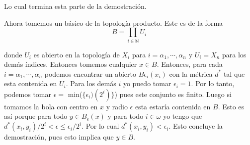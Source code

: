 \documentclass[letter,twoside,12pt]{article}
\begin{document}
\begin{enumerate}
Lo cual termina esta parte de la demostración.

Ahora tomemos un básico de la topología producto. Este es de la forma
\begin{equation}
B=\prod_{i \in \mathbb{N}} U_i \nonumber
\end{equation}

donde $ U_i $ es abierto en la topología de $ X_i $ para $ i = \alpha_1, \cdots, \alpha_n $ y $U_i=X_n$ para los demás índices. Entonces tomemos cualquier $ x \in B $. Entonces, para cada $ i = \alpha_1, \cdots, \alpha_n $ podemos encontrar un abierto $B\epsilon_i(x_i)$ con la métrica $d^*$ tal que esta contenida en $ U_i $. Para los demás $ i $ yo puedo tomar $ \epsilon_i=1 $. Por lo tanto, podemos tomar $\epsilon =$ min($ \{\epsilon_i)(2^i)\}$) pues este conjunto es finito. Luego si tomamos la bola con centro en $ x $ y radio $ \epsilon $ esta estaría contenida en $B$. Esto es así porque para todo $ y \in B_\epsilon(x) $ y para todo $ i \in \omega $ yo tengo que $d^*(x_i,y_i)/2^i<\epsilon\leq \epsilon_i/2^i$. Por lo cual $d^*(x_i,y_i)<\epsilon_i$. Esto concluye la demostración, pues esto implica que $y \in B$.

\end{enumerate}
\end{document}

